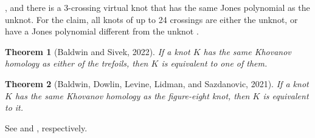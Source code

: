 \documentclass{article}
\theoremstyle{plain}
\newtheorem{theorem}{Theorem}
\begin{document}
        \cite{Thistlethwaite2001LINKSWT}, and there is a 3-crossing virtual
        knot that has the same Jones polynomial as the unknot. For the claim,
        all knots of up to 24 crossings are either the unknot, or have a
        Jones polynomial different from the unknot
        \cite{VerificationUnknotJonesConjUpTo24}.
        \begin{theorem}[Baldwin and Sivek, 2022]
            If a knot $K$ has the same Khovanov homology as either of the
            trefoils, then $K$ is equivalent to one of them.
        \end{theorem}
        \begin{theorem}[Baldwin, Dowlin, Levine, Lidman, and Sazdanovic, 2021]
            If a knot $K$ has the same Khovanov homology as the figure-eight
            knot, then $K$ is equivalent to it.
        \end{theorem}
        See \cite{BaldwinSivekKhovanovTrefoils} and
        \cite{BaldwinDowlinKhovanovFigureEight}, respectively.
\end{document}
